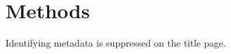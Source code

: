 \documentclass[config/load-project=false,document/type=paper,metadata/author={INSR Example Author},metadata/institution={INSR Example Institution},metadata/title={Blind Review Example},publication/review={double-blind},publication/status={under review}]{insr}
\begin{document}
\INSRMakeTitle\section{Methods}Identifying metadata is suppressed on the title page.
\end{document}
